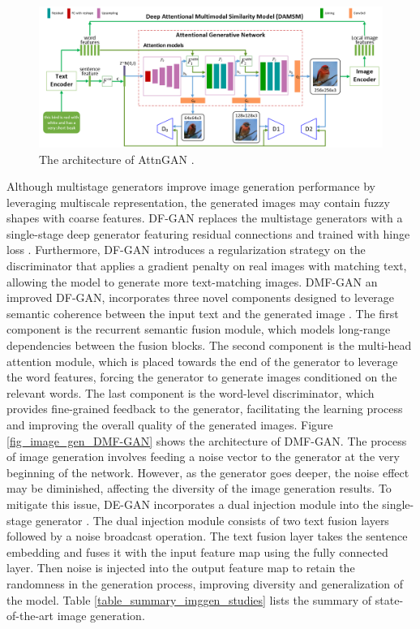 \documentclass[preprint,12pt]{elsarticle}
\begin{document}
\begin{figure}[h!]
    \centering
    \includegraphics[scale=0.5]{fig_image_gen_AttnGAN.png}
    \caption{The architecture of AttnGAN \citep{xu_attngan_2018}.}
    \label{fig_image_gen_AttnGAN}
\end{figure}

Although multistage generators improve image generation performance by leveraging multiscale representation, the generated images may contain fuzzy shapes with coarse features. DF-GAN replaces the multistage generators with a single-stage deep generator featuring residual connections and trained with hinge loss \citep{tao_df-gan_2022}. Furthermore, DF-GAN introduces a regularization strategy on the discriminator that applies a gradient penalty on real images with matching text, allowing the model to generate more text-matching images. DMF-GAN an improved DF-GAN, incorporates three novel components designed to leverage semantic coherence between the input text and the generated image \citep{yang_dmf-gan_2024}. The first component is the recurrent semantic fusion module, which models long-range dependencies between the fusion blocks. The second component is the multi-head attention module, which is placed towards the end of the generator to leverage the word features, forcing the generator to generate images conditioned on the relevant words. The last component is the word-level discriminator, which provides fine-grained feedback to the generator, facilitating the learning process and improving the overall quality of the generated images. Figure \ref{fig_image_gen_DMF-GAN} shows the architecture of DMF-GAN. The process of image generation involves feeding a noise vector to the generator at the very beginning of the network. However, as the generator goes deeper, the noise effect may be diminished, affecting the diversity of the image generation results. To mitigate this issue, DE-GAN incorporates a dual injection module into the single-stage generator \citep{jiang_-gan_2024}. The dual injection module consists of two text fusion layers followed by a noise broadcast operation. The text fusion layer takes the sentence embedding and fuses it with the input feature map using the fully connected layer. Then noise is injected into the output feature map to retain the randomness in the generation process, improving diversity and generalization of the model. Table \ref{table_summary_imggen_studies} lists the summary of state-of-the-art image generation.
\end{document}

